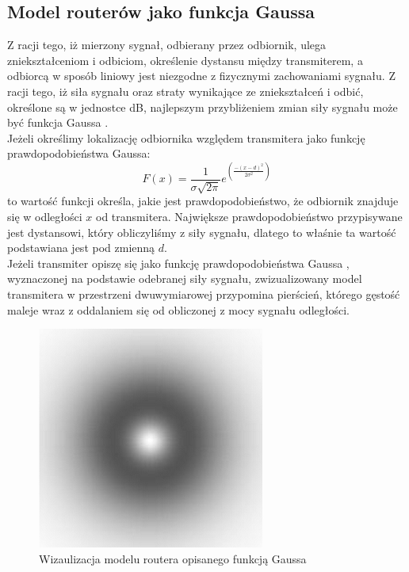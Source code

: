 \subsection{Model routerów jako funkcja Gaussa}
Z racji tego, iż mierzony sygnał, odbierany przez odbiornik, ulega zniekształceniom i odbiciom, określenie dystansu między transmiterem, a odbiorcą w sposób liniowy jest niezgodne z fizycznymi zachowaniami sygnału. Z racji tego, iż siła sygnału oraz straty wynikające ze zniekształceń i odbić, określone są w jednostce dB, najlepszym przybliżeniem zmian siły sygnału może być funkcja Gaussa \cite{GMBF}.\\
Jeżeli określimy lokalizację odbiornika względem transmitera jako funkcję prawdopodobieństwa Gaussa:
\begin{equation}
F(x) = \frac{1}{\sigma\sqrt{2\pi}}e^{\left(\frac{-(x-d)^2}{2\sigma^2}\right)}
\end{equation}
to wartość funkcji określa, jakie jest prawdopodobieństwo, że odbiornik znajduje się w odległości $x$ od transmitera. Największe prawdopodobieństwo przypisywane jest dystansowi, który obliczyliśmy z siły sygnału, dlatego to właśnie ta wartość podstawiana jest pod zmienną $d$. \cite{JK}\\
Jeżeli transmiter opiszę się jako funkcję prawdopodobieństwa Gaussa \cite{YX}, wyznaczonej na podstawie odebranej siły sygnału, zwizualizowany model transmitera w przestrzeni dwuwymiarowej przypomina pierścień, którego gęstość maleje wraz z oddalaniem się od obliczonej z mocy sygnału odległości.
\begin{figure}[H]			
	\centering
	\caption{Wizaulizacja modelu routera opisanego funkcją Gaussa}
	\includegraphics{router_Gaussa_wizualizacja}
\end{figure}
